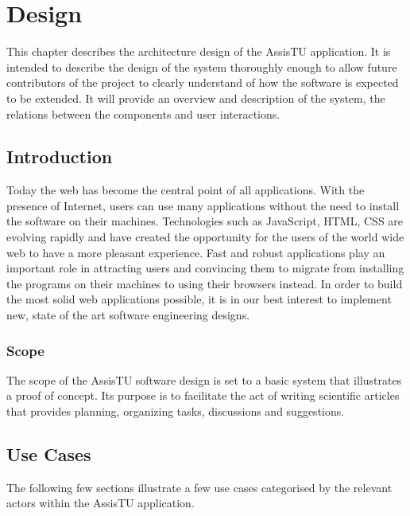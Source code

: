 \chapter{Design}

This chapter describes the architecture design of the AssisTU application. It is intended to describe the design of the system thoroughly enough to allow future contributors of the project to clearly understand of how the software is expected to be extended. It will provide an overview and description of the system, the relations between the components and user interactions.

\section{Introduction} %
\label{sec:introduction}

Today the web has become the central point of all applications. With the presence of Internet, users can use many applications without the need to install the software on their machines. Technologies such as JavaScript, HTML, CSS are evolving rapidly and have created the opportunity for the users of the world wide web to have a more pleasant experience. Fast and robust applications play an important role in attracting users and convincing them to migrate from installing the programs on their machines to using their browsers instead. In order to build the most solid web applications possible, it is in our best interest to implement new, state of the art software engineering designs.


\subsection{Scope} %
\label{sub:scope}
The scope of the AssisTU software design is set to a basic system that illustrates a proof of concept. Its purpose is to facilitate the act of writing scientific articles that provides planning, organizing tasks, discussions and suggestions.

\section{Use Cases} %
\label{sec:system_overview}
The following few sections illustrate a few use cases categorised by the relevant actors within the AssisTU application.

